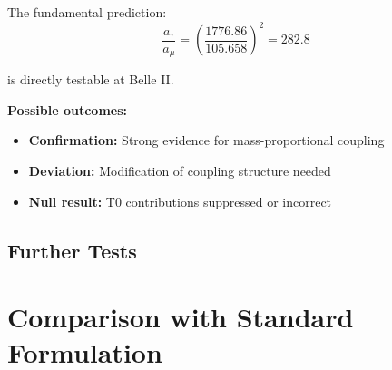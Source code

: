 	The fundamental prediction:
	\begin{equation}
		\frac{a_\tau}{a_\mu} = \left(\frac{1776.86}{105.658}\right)^2 = 282.8
	\end{equation}
	
	is directly testable at Belle II.
	
	\textbf{Possible outcomes:}
	\begin{itemize}
		\item \textbf{Confirmation:} Strong evidence for mass-proportional coupling
		\item \textbf{Deviation:} Modification of coupling structure needed
		\item \textbf{Null result:} T0 contributions suppressed or incorrect
	\end{itemize}
	
	\subsection{Further Tests}
	
	\begin{table}[h]
		\centering
		\caption{Experimental tests of the T0 Dirac formulation}
	\end{table}
	
	\section{Comparison with Standard Formulation}
	
